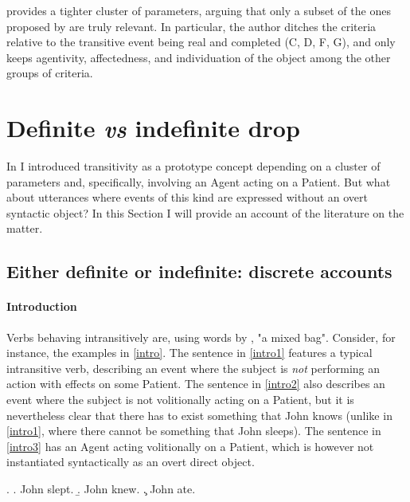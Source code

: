 \textcite[78]{Lorenzetti2008} provides a tighter cluster of parameters, arguing that only a subset of the ones proposed by \textcite{HopperThompson1980} are truly relevant. In particular, the author ditches the criteria relative to the transitive event being real and completed (C, D, F, G), and only keeps agentivity, affectedness, and individuation of the object among the other groups of criteria.


\section{Definite \textit{vs} indefinite drop} 

In  I introduced transitivity as a prototype concept depending on a cluster of parameters and, specifically, involving an Agent acting on a Patient. But what about utterances where events of this kind are expressed without an overt syntactic object? In this Section I will provide an account of the literature on the matter.

\subsection{Either definite or indefinite: discrete accounts} 

\paragraph{Introduction}
Verbs behaving intransitively are, using words by \textcite[191]{rutherford1998workbook}, "a mixed bag". Consider, for instance, the examples in \ref{intro}. The sentence in \ref{intro1} features a typical intransitive verb, describing an event where the subject is \textit{not} performing an action with effects on some Patient. The sentence in \ref{intro2} also describes an event where the subject is not volitionally acting on a Patient, but it is nevertheless clear that there has to exist something that John knows (unlike in \ref{intro1}, where there cannot be something that John sleeps). The sentence in \ref{intro3} has an Agent acting volitionally on a Patient, which is however not instantiated syntactically as an overt direct object.

\ex. \label{intro} \a. \label{intro1} John slept.
\b. \label{intro2} John knew.
\c. \label{intro3} John ate.

